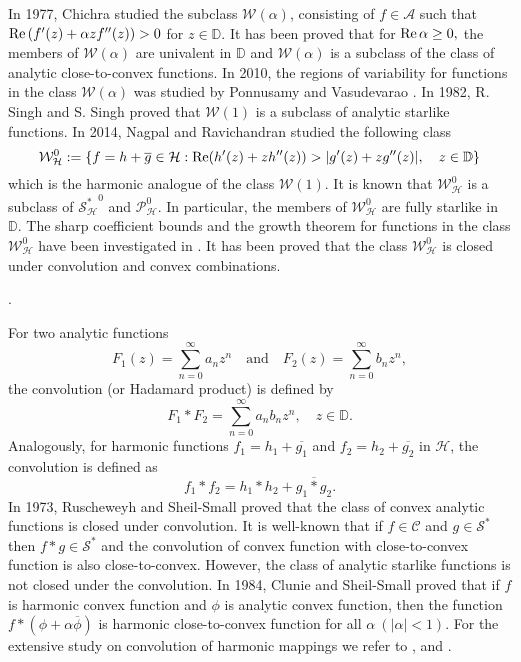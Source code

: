 \documentclass[a4paper,12pt]{amsart}
\theoremstyle{plain}
\theoremstyle{definition}
\newcounter {own}
\begin{document}
In 1977, Chichra \cite{Chichra-1977} studied the subclass $\mathcal{W}(\alpha)$, consisting  of $f\in\mathcal{A}$ such that   ${\rm Re\,}(f'(z) + {\alpha}z f''(z))> 0$ for $z\in \mathbb{D}$. It has been proved that  for ${\rm Re\,}\alpha \geq 0,$ the members of $\mathcal{W}(\alpha)$ are univalent in $\mathbb{D}$ and $\mathcal{W}(\alpha)$ is a subclass of the class of analytic close-to-convex  functions. In 2010, the regions of variability for functions in the class $\mathcal{W}(\alpha)$ was studied by Ponnusamy and Vasudevarao \cite{Ponnusamy-Vasu-2010}.  In 1982,  R. Singh and S. Singh \cite{Singh-Singh-1981} proved that $\mathcal{W}(1)$ is a subclass of analytic starlike functions.
In 2014, Nagpal and Ravichandran \cite{Nagpal-Ravichandran-2014} studied the following class
 $$
 \mathcal{W}^0_{\mathcal{H}} := \{ f = h + \overline{g}\in\mathcal{H}: {\rm Re}(h'(z) +  z h''(z)) >|g'(z) +  z g''(z)|,\quad z\in \mathbb{D}\}
 $$
 which is the harmonic analogue of the class $\mathcal{W}(1)$.  It is known that $\mathcal{W}^0_{\mathcal{H}}$ is a subclass of $\mathcal{S^*_H}^0$ and $\mathcal{P}^0_{\mathcal{H}}$. In particular, the members of $\mathcal{W}^0_{\mathcal{H}}$ are fully starlike in $\mathbb{D}$. The sharp coefficient bounds and the growth theorem for functions in the class $\mathcal{W}^0_{\mathcal{H}}$ have been investigated in \cite{Nagpal-Ravichandran-2014}. It has been  proved that the class $\mathcal{W}^0_{\mathcal{H}}$ is closed under convolution and  convex combinations.

 .
 

For two analytic functions
$$
F_1(z) =  \sum _{n = 0}^{\infty} a_n z^{n} \quad \mbox{and} \quad F_2(z) =  \sum _{n = 0}^{\infty} b_n z^{n},
$$
 the convolution (or Hadamard product) is defined by
$$
F_1 * F_2 =  \sum _{n = 0}^{\infty} a_n b_n z^{n} ,\quad  z\in \mathbb{D}.
$$
Analogously, for harmonic functions $f_1 = h_1 + \overline{g_1}$ and $f_2 = h_2 + \overline{g_2}$ in $\mathcal{H}$, the convolution  is defined as
$$
f_1 * f_2 = h_1 * h_2 + \overline {g_1 * g_2}.
$$
In 1973, Ruscheweyh and Sheil-Small \cite{Ruscheweyh-Sheil-Small-1973} proved that the class of convex analytic functions is closed under convolution. 
It is well-known that if $f\in\mathcal{C}$  and $g\in\mathcal{S}^*$ then $f*g\in\mathcal{S}^*$ and the convolution of convex function with close-to-convex function is also close-to-convex. However, the class of analytic starlike functions is not closed under the convolution. In 1984, Clunie and Sheil-Small {\cite{Clunie-1984}} proved that if $f$ is harmonic convex function and $\phi$ is  analytic convex function, then the function $f * (\phi + \alpha \overline{\phi})$ is harmonic close-to-convex function for all $\alpha~ (|\alpha| < 1)$.
For the extensive study on convolution of harmonic mappings we refer to \cite{Dorff-2001}, \cite{Dorff-2012} and \cite{Goodloe-2002}.
\end{document}
